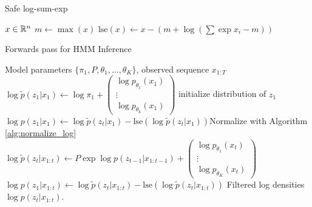 \begin{algorithm}
   \caption{Safe log-sum-exp}
   \label{alg:normalize_log}
   \begin{algorithmic}
      $x \in \mathbb{R}^{n}$
     \STATE $m \leftarrow \max\left(x\right)$
      $\text{lse}\left(x\right) \leftarrow x - \left(m + \log\left(\sum\exp{x_{i} - m}\right)\right)$
   \end{algorithmic}
\end{algorithm}

\begin{algorithm}
   \caption{Forwards pass for HMM Inference}
   \label{alg:hmm_forwards}
\begin{algorithmic}
   Model parameters $\{\pi_{1}, P, \theta_1, \dots, \theta_K\}$,
  observed sequence $x_{1:T}$
  \STATE $\log \tilde{p}\left(z_{1}\vert x_{1}\right) \leftarrow
  \log\pi_{1} + \begin{pmatrix} \log p_{\theta_{1}}\left(x_{1}\right) \\ \vdots \\ \log p_{\theta_{k}}\left(x_{1}\right) \end{pmatrix}$ \hfill initialize distribution of $z_{1}$
  \STATE $\log p\left(z_{1} \vert x_{1}\right) \leftarrow \log \tilde{p}\left(z_{t} \vert x_{1}\right) - \text{lse}\left(\log \tilde{p}\left(z_{t} \vert x_{1}\right)\right)$\hfill Normalize with Algorithm \ref{alg:normalize_log}
  \STATE $\log \tilde{p}\left(z_{t} \vert x_{1:t}\right) \leftarrow P \exp{\log p\left(z_{t - 1} \vert x_{1:t - 1}\right)} + \begin{pmatrix}  \log p_{\theta_{1}}\left(x_{t}\right) \\ \vdots \\ \log p_{\theta_{K}}\left(x_{t}\right) \end{pmatrix}$
  \STATE $\log p\left(z_{1} \vert x_{1:t}\right) \leftarrow \log \tilde{p}\left(z_{t} \vert x_{1:t}\right) - \text{lse}\left(\log \tilde{p}\left(z_{t} \vert x_{1:t}\right)\right)$\hfill
  \ENDFOR
   Filtered log densities $\log p\left(z_{t} \vert x_{1:t}\right)$.
\end{algorithmic}
\end{algorithm}

